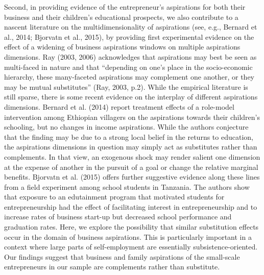 \documentclass[11.5pt]{article}
\begin{document}
Second, in providing evidence of the entrepreneur's aspirations for both their business and their children's educational prospects, we also contribute to a nascent literature on the multidimensionality of aspirations (see, e.g., Bernard et al., 2014; Bjorvatn et al., 2015), by providing first experimental evidence on the effect of a widening of business aspirations windows on multiple aspirations dimensions. Ray (2003, 2006) acknowledges that aspirations may best be seen as multi-faced in nature and that ``depending on one's place in the socio-economic hierarchy, these many-faceted aspirations may complement one another, or they may be mutual substitutes'' (Ray, 2003, p.2). While the empirical literature is still sparse, there is some recent evidence on the interplay of different aspirations dimensions. Bernard et al. (2014) report treatment effects of a role-model intervention among Ethiopian villagers on the aspirations towards their children's schooling, but no changes in income aspirations. While the authors conjecture that the finding may be due to a strong local belief in the returns to education, the aspirations dimensions in question may simply act as substitutes rather than complements. In that view, an exogenous shock may render salient one dimension at the expense of another in the pursuit of a goal or change the relative marginal benefits. Bjorvatn et al. (2015) offers further suggestive evidence along these lines from a field experiment among school students in Tanzania. The authors show that exposure to an edutainment program that motivated students for entrepreneurship had the effect of facilitating interest in entrepreneurship and to increase rates of business start-up but decreased school performance and graduation rates. Here, we explore the possibility that similar substitution effects occur in the domain of business aspirations. This is particularly important in a context where large parts of self-employment are essentially subsistence-oriented. Our findings suggest that business and family aspirations of the small-scale entrepreneurs in our sample are complements rather than substitute.
\end{document}
